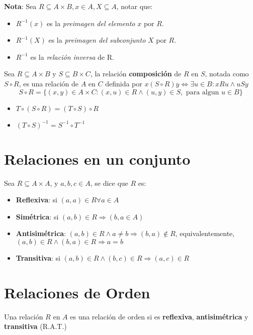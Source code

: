 \documentclass[11pt,a4paper]{article}
\begin{document}
\noindent \textbf{Nota}: Sea $R \subseteq A \times B, x\in A, X\subseteq A$, notar que:
\begin{itemize}
\item $R^{-1}(x)$ es la \textit{preimagen del elemento} $x$ por $R$.
\item $R^{-1}(X)$ es la \textit{preimagen del subconjunto} $X$ por $R$.
\item $R^{-1}$ es la \textit{relaci\'on inversa} de R.\\
\end{itemize}

\noindent Sea $R \subseteq A \times B$ y $S \subseteq B \times C$, la relaci\'on \textbf{composici\'on} de $R$ en $S$, notada como $S \circ R$, es una relaci\'on de $A$ en $C$ definida por $x(S \circ R)y \iff \exists u \in B : xRu \land uSy$
$$ S \circ R = \{ (x,y) \in A\times C : (x,u) \in R \land (u,y) \in S, \text{ para algun } u \in B \} $$

\begin{multicols}{2}
\begin{itemize}
\item $T \circ (S \circ R) = (T \circ S) \circ R$
\item $(T \circ S)^{-1} = S^{-1} \circ T^{-1}$
\end{itemize}
\end{multicols}


\newpage
\section{Relaciones en un conjunto}
\noindent Sea $R \subseteq A \times A$, y $a,b,c \in A$, se dice que $R$ es:
\begin{itemize}
\item \textbf{Reflexiva}: si $(a,a) \in R \forall a \in A$
\item \textbf{Sim\'etrica}: si $(a,b) \in R \Rightarrow (b,a \in A)$
\item \textbf{Antisim\'etrica}: $(a,b) \in R \land a \not = b \Rightarrow (b,a) \not \in R$, equivalentemente, $(a,b) \in R \land (b,a) \in R \Rightarrow a = b$
\item \textbf{Transitiva}: si $(a,b) \in R \land (b,c) \in R \Rightarrow (a,c) \in R$
\end{itemize}

\section{Relaciones de Orden}
\noindent Una relaci\'on $R$ en $A$ es una relaci\'on de orden si es \textbf{reflexiva}, \textbf{antisim\'etrica} y \textbf{transitiva} (R.A.T.)\\
\end{document}
